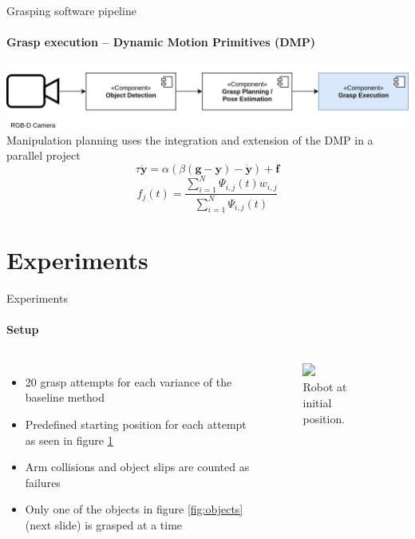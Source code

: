 \documentclass{beamer}
\begin{document}
\begin{frame}{Grasping software pipeline}
    \framesubtitle{Grasp execution -- Dynamic Motion Primitives (DMP)}
    \includegraphics[width=\linewidth]{grasp_pipeline_execution}
    Manipulation planning uses the integration and extension of the DMP in a parallel project \cite{Padalkar2018}
    \begin{equation*}
        \tau \ddot{\mathbf{y}} = \alpha(\beta(\mathbf{g} - \mathbf{y}) - \dot{\mathbf{y}}) + \mathbf{f}
    \end{equation*}
    \begin{equation*}
        f_j(t) = \frac{\sum_{i=1}^{N}\Psi_{i,j}(t)w_{i,j}}{\sum_{i=1}^{N}\Psi_{i,j}(t)}
    \end{equation*}
\end{frame}

\section{Experiments}
\begin{frame}{Experiments}
\framesubtitle{Setup}
    \begin{columns}[onlytextwidth]
        \begin{itemize}
            \footnotesize
            \item 20 grasp attempts for each variance of the baseline method
            \item Predefined starting position for each attempt as seen in figure \ref{fig:exp_setup}
            \item Arm collisions and object slips are counted as failures
            \item Only one of the objects in figure \ref{fig:objects} (next slide) is grasped at a time
        \end{itemize}
        \begin{figure}[b]
            \includegraphics<1->[width=\textwidth]{experimental_setup}
            \caption{\small Robot at initial position.}
            \label{fig:exp_setup}
        \end{figure}
    \end{columns}
\end{frame}
\end{document}
